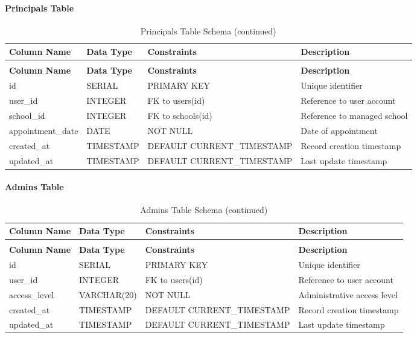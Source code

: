 \documentclass[12pt,a4paper]{report}
\begin{document}
\paragraph{Principals Table}
\begin{longtable}{|p{3cm}|p{3cm}|p{2cm}|p{6cm}|}
\caption{Principals Table Schema}
\label{tab:principals}\\
\hline
\textbf{Column Name} & \textbf{Data Type} & \textbf{Constraints} & \textbf{Description} \\
\hline
\endfirsthead
\caption[]{Principals Table Schema (continued)}\\
\hline
\textbf{Column Name} & \textbf{Data Type} & \textbf{Constraints} & \textbf{Description} \\
\hline
\endhead
id & SERIAL & PRIMARY KEY & Unique identifier \\
\hline
user\_id & INTEGER & FK to users(id) & Reference to user account \\
\hline
school\_id & INTEGER & FK to schools(id) & Reference to managed school \\
\hline
appointment\_date & DATE & NOT NULL & Date of appointment \\
\hline
created\_at & TIMESTAMP & DEFAULT CURRENT\_TIMESTAMP & Record creation timestamp \\
\hline
updated\_at & TIMESTAMP & DEFAULT CURRENT\_TIMESTAMP & Last update timestamp \\
\hline
\end{longtable}

\paragraph{Admins Table}
\begin{longtable}{|p{3cm}|p{3cm}|p{2cm}|p{6cm}|}
\caption{Admins Table Schema}
\label{tab:admins}\\
\hline
\textbf{Column Name} & \textbf{Data Type} & \textbf{Constraints} & \textbf{Description} \\
\hline
\endfirsthead
\caption[]{Admins Table Schema (continued)}\\
\hline
\textbf{Column Name} & \textbf{Data Type} & \textbf{Constraints} & \textbf{Description} \\
\hline
\endhead
id & SERIAL & PRIMARY KEY & Unique identifier \\
\hline
user\_id & INTEGER & FK to users(id) & Reference to user account \\
\hline
access\_level & VARCHAR(20) & NOT NULL & Administrative access level \\
\hline
created\_at & TIMESTAMP & DEFAULT CURRENT\_TIMESTAMP & Record creation timestamp \\
\hline
updated\_at & TIMESTAMP & DEFAULT CURRENT\_TIMESTAMP & Last update timestamp \\
\hline
\end{longtable}
\end{document}
